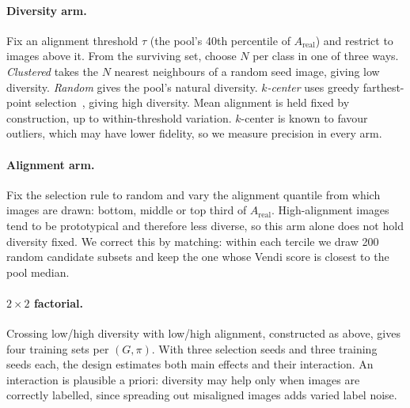 \documentclass[10pt,twocolumn,letterpaper]{article}
\newcommand{\Areal}{A_{\text{real}}}
\begin{document}
\paragraph{Diversity arm.} Fix an alignment threshold $\tau$ (the pool's 40th percentile of $\Areal$) and restrict to images above it. From the surviving set, choose $N$ per class in one of three ways. \emph{Clustered} takes the $N$ nearest neighbours of a random seed image, giving low diversity. \emph{Random} gives the pool's natural diversity. \emph{$k$-center} uses greedy farthest-point selection~\cite{gonzalez1985clustering}, giving high diversity. Mean alignment is held fixed by construction, up to within-threshold variation. $k$-center is known to favour outliers, which may have lower fidelity, so we measure precision in every arm.

\paragraph{Alignment arm.} Fix the selection rule to random and vary the alignment quantile from which images are drawn: bottom, middle or top third of $\Areal$. High-alignment images tend to be prototypical and therefore less diverse, so this arm alone does not hold diversity fixed. We correct this by matching: within each tercile we draw 200 random candidate subsets and keep the one whose Vendi score is closest to the pool median.

\paragraph{$2{\times}2$ factorial.} Crossing low/high diversity with low/high alignment, constructed as above, gives four training sets per $(G,\pi)$. With three selection seeds and three training seeds each, the design estimates both main effects and their interaction. An interaction is plausible a priori: diversity may help only when images are correctly labelled, since spreading out misaligned images adds varied label noise.
\end{document}
